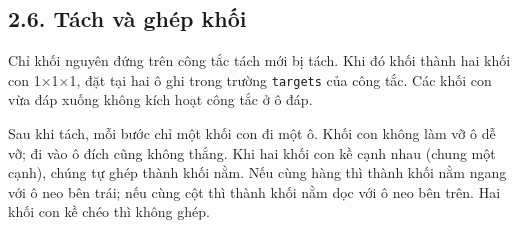 \subsection{2.6. Tách và ghép khối}

Chỉ khối nguyên đứng trên công tắc tách mới bị tách. Khi đó khối thành hai khối con 1×1×1, đặt tại hai ô ghi trong trường \texttt{targets} của công tắc. Các khối con vừa đáp xuống không kích hoạt công tắc ở ô đáp.

Sau khi tách, mỗi bước chỉ một khối con đi một ô. Khối con không làm vỡ ô dễ vỡ; đi vào ô đích cũng không thắng. Khi hai khối con kề cạnh nhau (chung một cạnh), chúng tự ghép thành khối nằm. Nếu cùng hàng thì thành khối nằm ngang với ô neo bên trái; nếu cùng cột thì thành khối nằm dọc với ô neo bên trên. Hai khối con kề chéo thì không ghép.


